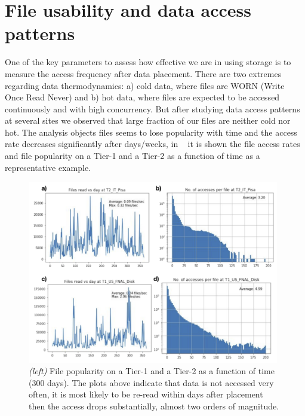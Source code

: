 \section{File usability and data access patterns}
One of the key parameters to assess how effective we are in using storage is to measure the access frequency after data placement. There are two extremes regarding data thermodynamics: a) cold data, where files are WORN (Write Once Read Never) and b) hot data, where files are expected to be accessed continuously and with high concurrency. But after studying data access patterns at several sites we observed that large fraction of our files are neither cold nor hot. The analysis objects files seems to lose popularity with time and the access rate decreases significantly after days/weeks, in ~ it is shown the file access rates and file popularity on a Tier-1 and a Tier-2 as a function of time as a representative example.

\begin{figure}[h]
  \centering
  \includegraphics[height=8cm]{dataaccess-chep2019.png}
  \caption{{\em (left)} File popularity on a Tier-1 and a Tier-2 as a function of time (300 days). The plots above indicate that data is not accessed very often, it is most likely to be re-read within days after placement then the access drops substantially, almost two orders of magnitude.}
  \label{access}
\end{figure}

